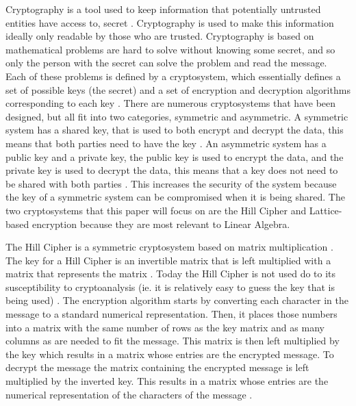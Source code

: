 \documentclass{../mathhomework}
\begin{document}
Cryptography is a tool used to keep information that potentially untrusted entities have access to,
secret \cite{menezes97}. Cryptography is used to make this information ideally only readable by those who are 
trusted. Cryptography is based on mathematical problems are hard to solve without knowing some secret, 
and so only the person with the secret can solve the problem and read the message. Each of these problems is 
defined by a cryptosystem, which essentially defines a set of possible keys (the secret) and a set of encryption 
and decryption algorithms corresponding to each key \cite{zwicke03}. There are numerous cryptosystems that have been 
designed, but all fit into two categories, symmetric and asymmetric. A symmetric system has a shared key, that 
is used to both encrypt and decrypt the data, this means that both parties need to have the key \cite{zwicke03}. An 
asymmetric system has a public key and a private key, the public key is used to encrypt the data, and the private 
key is used to decrypt the data, this means that a key does not need to be shared with both parties \cite{zwicke03}. 
This increases the security of the system because the key of a symmetric system can be compromised when it is 
being shared. The two cryptosystems that this paper will focus on are the Hill Cipher and Lattice-based encryption 
because they are most relevant to Linear Algebra.

The Hill Cipher is a symmetric cryptosystem based on matrix multiplication \cite{overbey05}. The key for a Hill Cipher is 
an invertible matrix that is left multiplied with a matrix that represents the matrix  \cite{overbey05}. Today the Hill 
Cipher is not used do to its susceptibility to cryptoanalysis (ie. it is relatively easy to guess the key that is 
being used) \cite{overbey05}. The encryption algorithm starts by converting each character in the message to a 
standard numerical representation. Then, it places those numbers into a matrix with the same number of rows as 
the key matrix and as many columns as are needed to fit the message. This matrix is then left multiplied by the 
key which results in a matrix whose entries are the encrypted message. To decrypt the message the matrix 
containing the encrypted message is left multiplied by the inverted key. This results in a matrix whose entries 
are the numerical representation of the characters of the message \cite{hill29}.
\end{document}
